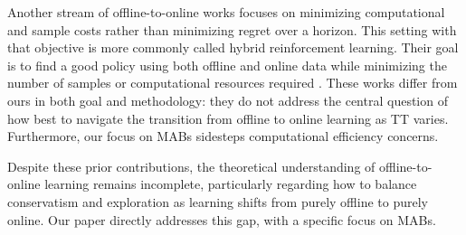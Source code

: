 Another stream of offline-to-online works focuses on minimizing computational and sample costs rather than minimizing regret over a horizon. This setting with that objective is more commonly called hybrid reinforcement learning. Their goal is to find a good policy using both offline and online data while minimizing the number of samples or computational resources required \citep{Song2022-vg,xie2022policyfinetuningbridgingsampleefficient,ball2023efficient,
wagenmaker2023leveraging,Li2023-lv, li2024reward, zhou2023offlinedataenhancedonpolicy}. These works differ from ours in both goal and methodology: they do not address the central question of how best to navigate the transition from offline to online learning as TT varies. Furthermore, our focus on MABs sidesteps computational efficiency concerns.

Despite these prior contributions, the theoretical understanding of offline-to-online learning remains incomplete, particularly regarding how to balance conservatism and exploration as learning shifts from purely offline to purely online. Our paper directly addresses this gap, with a specific focus on MABs.